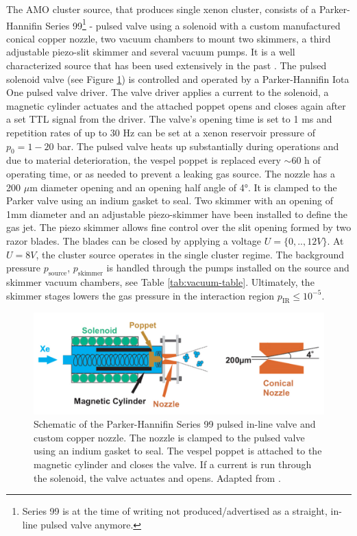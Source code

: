 The AMO cluster source, that produces single xenon cluster, consists of a Parker-Hannifin Series 99\footnote{Series 99 is at the time of writing not produced/advertised as a straight, in-line pulsed valve anymore.} - pulsed valve using a solenoid with a custom manufactured conical copper nozzle, two vacuum chambers to mount two skimmers, a third adjustable piezo-slit skimmer and several vacuum pumps. It is a well characterized source that has been used extensively in the past \citep{Ferguson-2016-SciAdv,Ferguson-2015-JSR,Gorkhover-2012-PRL,Gorkhover-2016-NatPho,Rupp-2014-JCP}. The pulsed solenoid valve (see Figure \ref{fig:parker-valve}) is controlled and operated by a Parker-Hannifin Iota One pulsed valve driver. The valve driver applies a current to the solenoid, a magnetic cylinder actuates and the attached poppet opens and closes again after a set TTL signal from the driver. The valve's opening time is set to 1 ms and repetition rates of up to $30$ Hz can be set at a xenon reservoir pressure of $p_{0}=1-20$ bar. The pulsed valve heats up substantially during operations and due to material deterioration, the vespel poppet is replaced every $\sim 60$ h of operating time, or as needed to prevent a leaking gas source. The nozzle has a 200 $\mu$m diameter opening and an opening half angle of 4°. It is clamped to the Parker valve using an indium gasket to seal. Two skimmer with an opening of 1mm diameter and an adjustable piezo-skimmer have been installed to define the gas jet. The piezo skimmer allows fine control over the slit opening formed by two razor blades. The blades can be closed by applying a voltage $U=\{0,..,12V\}$. At $U=8V$, the cluster source operates in the single cluster regime. The background pressure $p_{\text{source}}$, $p_{\text{skimmer}}$ is handled through the pumps installed on the source and skimmer vacuum chambers, see Table \ref{tab:vacuum-table}. Ultimately, the skimmer stages lowers the gas pressure in the interaction region $p_{\text{IR}}\leq 10^{-5}$.\\
\begin{figure}
	\centering
		\includegraphics[width=1.00\textwidth]{images/parker-valve.jpg}
	\caption[Schematic of the Parker-Hannifin Series 99 valve.]{Schematic of the Parker-Hannifin Series 99 pulsed in-line valve and custom copper nozzle. The nozzle is clamped to the pulsed valve using an indium gasket to seal. The vespel poppet is attached to the magnetic cylinder and closes the valve. If a current is run through the solenoid, the valve actuates and opens. Adapted from \citep[\href{http://creativecommons.org/licenses/by-nc/3.0/us}{\ccbync}]{Ferguson-2016-PhD}.}
	\label{fig:parker-valve}
\end{figure}
